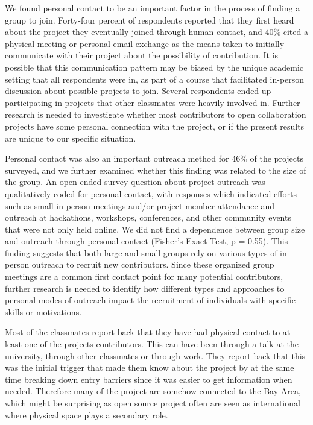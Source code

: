 We found personal contact to be an important factor in the process of finding a group to join. Forty-four percent of respondents reported that they first heard about the project they eventually joined through human contact, and 40\% cited a physical meeting or personal email exchange as the means taken to initially communicate with their project about the possibility of contribution. It is possible that this communication pattern may be biased by the unique academic setting that all respondents were in, as part of a course that facilitated in-person discussion about possible projects to join. Several respondents ended up participating in projects that other classmates were heavily involved in. Further research is needed to investigate whether most contributors to open collaboration projects have some personal connection with the project, or if the present results are unique to our specific situation.

Personal contact was also an important outreach method for 46\% of the projects surveyed, and we further examined whether this finding was related to the size of the group. An open-ended survey question about project outreach was qualitatively coded for personal contact, with responses which indicated efforts such as small in-person meetings and/or project member attendance and outreach at hackathons, workshops, conferences, and other community events that were not only held online. We did not find a dependence between group size and outreach through personal contact (Fisher’s Exact Test, p = 0.55). This finding suggests that both large and small groups rely on various types of in-person outreach to recruit new contributors. Since these organized group meetings are a common first contact point for many potential contributors, further research is needed to identify how different types and approaches to personal modes of outreach impact the recruitment of individuals with specific skills or motivations.

Most of the classmates report back that they have had physical contact to at least one of the projects contributors. This can have been through a talk at the university, through other classmates or through work. They report back that this was the initial trigger that made them know about the project by at the same time breaking down entry barriers since it was easier to get information when needed. Therefore many of the project are somehow connected to the Bay Area, which might be surprising as open source project often are seen as international where physical space plays a secondary role.